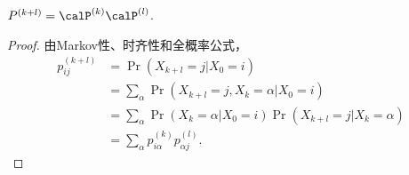\begin{theorem}\label{thm:kolmogorov-chapman}
    $P^{(k+l)}=\calP^{(k)}\calP^{(l)}$.
\end{theorem}

\begin{proof}
由Markov性、时齐性和全概率公式，
\begin{align*}
    p_{ij}^{(k+l)} &= \Pr(X_{k+l}=j|X_0=i) \\
 &= \sum_{\alpha}\Pr(X_{k+l}=j,X_k=\alpha|X_0=i) \\
 &= \sum_{\alpha}\Pr(X_k=\alpha|X_0=i)\Pr(X_{k+l}=j|X_k=\alpha) \\
 &= \sum_{\alpha} p_{i\alpha}^{(k)}p_{\alpha j}^{(l)}.
\end{align*}
\end{proof}


